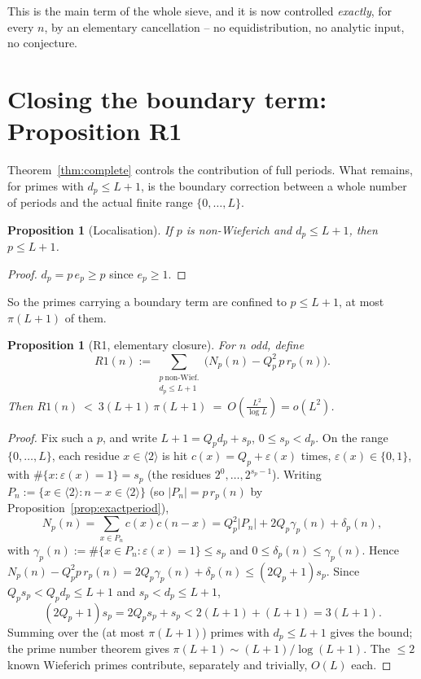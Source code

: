 \documentclass[11pt]{article}
\theoremstyle{plain}
\newtheorem{proposition}[theorem]{Proposition}
\theoremstyle{definition}
\theoremstyle{remark}
\newcommand{\dpp}{d_p}
\newcommand{\ep}{e_p}
\begin{document}
This is the main term of the whole sieve, and it is now controlled
\emph{exactly}, for every $n$, by an elementary cancellation -- no
equidistribution, no analytic input, no conjecture.

\section{Closing the boundary term: Proposition R1}\label{sec:R1}

Theorem~\ref{thm:complete} controls the contribution of full periods. What
remains, for primes with $\dpp\le L+1$, is the boundary correction between a
whole number of periods and the actual finite range $\{0,\dots,L\}$.

\begin{proposition}[Localisation]\label{prop:locate}
If $p$ is non-Wieferich and $\dpp\le L+1$, then $p\le L+1$.
\end{proposition}
\begin{proof}
$\dpp=p\,\ep\ge p$ since $\ep\ge1$.
\end{proof}

So the primes carrying a boundary term are confined to $p\le L+1$, at most
$\pi(L+1)$ of them.

\begin{proposition}[R1, elementary closure]\label{prop:R1}
For $n$ odd, define
\[
R1(n):=\sum_{\substack{p\ \mathrm{non\text{-}Wief.}\\ \dpp\le L+1}}
\bigl(N_p(n)-Q_p^2\,p\,r_p(n)\bigr).
\]
Then $\displaystyle R1(n)\ <\ 3(L+1)\,\pi(L+1)\ =\ O\!\left(\frac{L^2}{\log L}\right)=o(L^2)$.
\end{proposition}
\begin{proof}
Fix such a $p$, and write $L+1=Q_pd_p+s_p$, $0\le s_p<d_p$. On the range
$\{0,\dots,L\}$, each residue $x\in\langle2\rangle$ is hit
$c(x)=Q_p+\varepsilon(x)$ times, $\varepsilon(x)\in\{0,1\}$, with
$\#\{x:\varepsilon(x)=1\}=s_p$ (the residues $2^0,\dots,2^{s_p-1}$). Writing
$P_n:=\{x\in\langle2\rangle:n-x\in\langle2\rangle\}$ (so $|P_n|=p\,r_p(n)$ by
Proposition~\ref{prop:exactperiod}),
\[
N_p(n)=\sum_{x\in P_n}c(x)c(n-x)
=Q_p^2|P_n|+2Q_p\gamma_p(n)+\delta_p(n),
\]
with $\gamma_p(n):=\#\{x\in P_n:\varepsilon(x)=1\}\le s_p$ and
$0\le\delta_p(n)\le\gamma_p(n)$. Hence
$N_p(n)-Q_p^2p\,r_p(n)=2Q_p\gamma_p(n)+\delta_p(n)\le(2Q_p+1)s_p$. Since
$Q_ps_p<Q_pd_p\le L+1$ and $s_p<d_p\le L+1$,
\[
(2Q_p+1)s_p=2Q_ps_p+s_p<2(L+1)+(L+1)=3(L+1).
\]
Summing over the (at most $\pi(L+1)$) primes with $\dpp\le L+1$ gives the
bound; the prime number theorem gives $\pi(L+1)\sim(L+1)/\log(L+1)$. The
$\le2$ known Wieferich primes contribute, separately and trivially, $O(L)$
each.
\end{proof}
\end{document}
